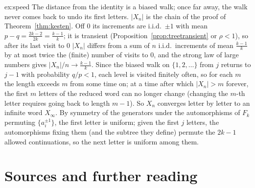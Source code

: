 \begin{solution}{ex:speed}
\idea The distance from the identity is a biased walk; once far away, the walk never comes back to undo its first letters.
\writeup $|X_n|$ is the chain of the proof of Theorem~\ref{thm:kesten}. Off $0$ its increments are i.i.d.\ $\pm1$ with mean $p-q=\frac{2k-2}{2k}=\frac{k-1}k$; it is transient (Proposition~\ref{prop:treetransient} or $\rho<1$), so after its last visit to $0$
$|X_n|$ differs from a sum of $n$ i.i.d.\ increments of mean $\frac{k-1}k$ by at most twice the (finite) number of visits to $0$, and the strong law of large numbers gives $|X_n|/n\to\frac{k-1}k$. Since the biased walk on $\{1,2,\dots\}$ from $j$ returns to $j-1$ with probability $q/p<1$, each
level is visited finitely often, so for each $m$ the length exceeds $m$ from some time on; at a time after which $|X_n|>m$ forever, the first $m$ letters of the reduced word can no longer change (changing the $m$-th
letter requires going back to length $m-1$). So $X_n$ converges letter by letter to an infinite word $X_\infty$. By symmetry of the generators under the automorphisms of $F_k$ permuting $\{a_i^{\pm1}\}$, the first letter is
uniform; given the first $j$ letters, the automorphisms fixing them (and the subtree they define) permute the $2k-1$ allowed continuations, so the next letter is uniform among them.
\end{solution}

\section*{Sources and further reading}

